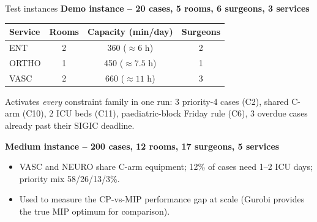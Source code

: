 \documentclass[10pt,aspectratio=169]{beamer}
\begin{document}
\begin{frame}{Test instances}
  \textbf{Demo instance -- 20 cases, 5 rooms, 6 surgeons, 3 services}
  \begin{center}\small
  \begin{tabular}{lccc}
    \toprule
    Service & Rooms & Capacity (min/day) & Surgeons \\
    \midrule
    ENT   & 2 & 360 ($\approx6$ h) & 2 \\
    ORTHO & 1 & 450 ($\approx7.5$ h) & 1 \\
    VASC  & 2 & 660 ($\approx11$ h) & 3 \\
    \bottomrule
  \end{tabular}
  \end{center}
  Activates \emph{every} constraint family in one run: 3 priority-4
  cases (C2), shared C-arm (C10), 2 ICU beds (C11), paediatric-block
  Friday rule (C6), 3 overdue cases already past their SIGIC deadline.

  \vspace{0.6em}
  \textbf{Medium instance -- 200 cases, 12 rooms, 17 surgeons, 5 services}
  \begin{itemize}\footnotesize
    \item VASC and NEURO share C-arm equipment; 12\% of cases need
      1--2 ICU days; priority mix 58/26/13/3\%.
    \item Used to measure the CP-vs-MIP performance gap at scale
      (Gurobi provides the true MIP optimum for comparison).
  \end{itemize}
\end{frame}
\end{document}
